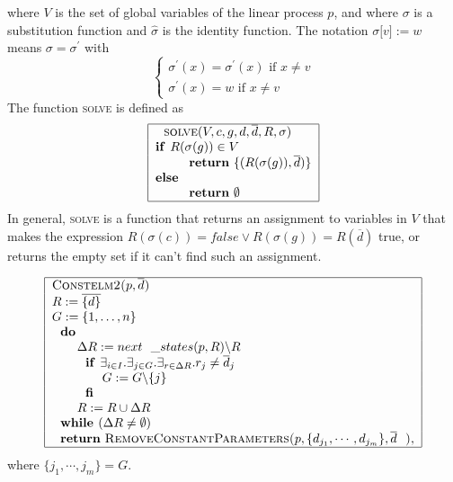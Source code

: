 \documentclass{article}
\begin{document}
where $V$ is the set of global variables of the linear process $p$, and
where $\sigma $ is a substitution function and $\widehat{\sigma }$ is the
identity function. The notation $\sigma \lbrack v]:=w$ means $\sigma =\sigma
^{\prime }$ with%
\[
\left\{ 
\begin{array}{l}
\sigma ^{\prime }(x)=\sigma ^{\prime }(x)\text{ if }x\neq v \\ 
\sigma ^{\prime }(x)=w\text{ if }x\neq v%
\end{array}%
\right. 
\]%
The function \textsc{solve} is defined as%
\[
\begin{tabular}{|l|}
\hline
$\text{\textsc{solve}}(V,c,g,d,\overline{d},R,\sigma )$ \\ 
\textbf{if }$R(\sigma (g))\in V$ \\ 
$\qquad \text{\textbf{return} }\{(R(\sigma (g)),\overline{d})\}$ \\ 
\textbf{else} \\ 
$\qquad \text{\textbf{return} }\emptyset $ \\ \hline
\end{tabular}%
\]%
In general, \textsc{solve} is a function that returns an assignment to
variables in $V$ that makes the expression $R(\sigma (c))=false\vee R(\sigma
(g))=R(\overline{d})$ true, or returns the empty set if it can't find such
an assignment.

\[
\begin{tabular}{|l|}
\hline
\textsc{Constelm2(}$p,\overline{d}$\textsc{)} \\ 
$R:=\overline{\{d\}}$ \\ 
$G:=\{1,\ldots ,n\}$ \\ 
$\text{\textbf{do}}$ \\ 
$\qquad \Delta R:=next\_states(p,R)\backslash R$ \\ 
$\qquad \text{\textbf{if }}\exists _{i\in I}.\exists _{j\in G}.\exists
_{r\in \Delta R}.r_{j}\neq \overline{d}_{j}$ \\ 
$\qquad \qquad G:=G\backslash \{j\}$ \\ 
$\qquad \text{\textbf{fi}}$ \\ 
$\qquad R:=R\cup \Delta R$ \\ 
$\text{\textbf{while }}(\Delta R\neq \emptyset )$ \\ 
$\text{\textbf{return} \textsc{RemoveConstantParameters(}}%
p,\{d_{j_{1}},\cdots ,d_{j_{m}}\},\overline{d}\text{\textsc{)}},$ \\ \hline
\end{tabular}%
\]%
where $\{j_{1},\cdots ,j_{m}\}=G$.\newpage
\end{document}
